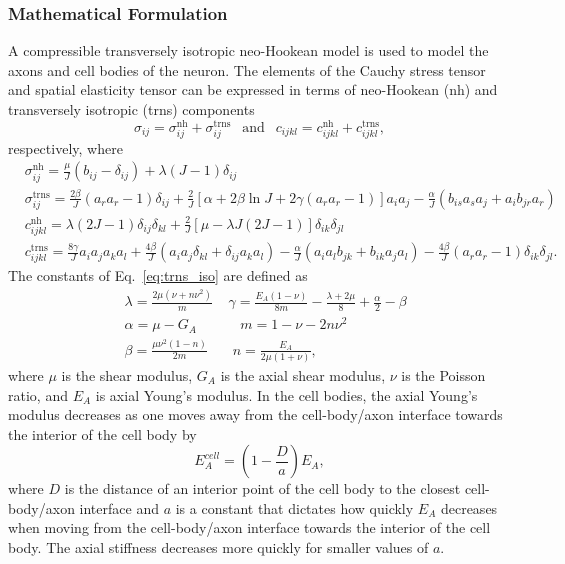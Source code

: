 \documentclass[10pt]{asme2ej}
\begin{document}
\subsubsection{Mathematical Formulation}
A compressible transversely isotropic neo-Hookean model is used to model \cite{Bonet:1998vc} the axons and cell bodies of the neuron. The elements of the Cauchy stress tensor and spatial elasticity tensor can be expressed in terms of neo-Hookean (nh) and transversely isotropic (trns) components \cite{Bonet:1998vc}
%
\begin{equation}
\sigma_{ij} = \sigma^{\text{nh}}_{ij} + \sigma^{\text{trns}}_{ij} \ \ \text{ and } \ \ c_{ijkl} = c^{\text{nh}}_{ijkl} + c^{\text{trns}}_{ijkl},
\end{equation}
%
respectively, where 
%
\begin{align}
&\sigma^{\text{nh}}_{ij} = \frac{\mu}{J}(b_{ij} - \delta_{ij}) + \lambda(J-1)\delta_{ij} \nonumber\\
%
&\sigma^{\text{trns}}_{ij} = \frac{2\beta}{J}(a_r a_r - 1)\delta_{ij} + \frac{2}{J}[\alpha+2\beta\ln J+2\gamma(a_r a_r -1)]a_i a_j - \frac{\alpha}{J}(b_{is}a_s a_j+a_i b_{jr}a_r) \nonumber\\
%
&c^{\text{nh}}_{ijkl} = \lambda(2J-1)\delta_{ij}\delta_{kl} + \frac{2}{J}[\mu - \lambda J(2J-1)]\delta_{ik}\delta_{jl} \nonumber\\
%
&c^{\text{trns}}_{ijkl} = \frac{8\gamma}{J}a_i a_j a_k a_l + \frac{4\beta}{J}(a_i a_j \delta_{kl} + \delta_{ij}a_k a_l) - \frac{\alpha}{J}(a_i a_l b_{jk} + b_{ik}a_j a_l) - \frac{4\beta}{J}(a_r a_r - 1)\delta_{ik}\delta_{jl}.
\label{eq:trns_iso}
\end{align}
%
The constants of Eq.\ \eqref{eq:trns_iso} are defined as
%
\begin{align}
&\lambda = \frac{2\mu (\nu+n\nu^2)}{m} \ \ \ \ \ \gamma = \frac{E_A(1-\nu)}{8m} - \frac{\lambda+2\mu}{8} + \frac{\alpha}{2} - \beta \nonumber\\
%
&\alpha = \mu - G_A \ \ \ \ \ \ \ \ \ \ \ \ \ \ m = 1 - \nu - 2 n\nu^2 \nonumber\\
%
&\beta = \frac{\mu \nu^2(1-n)}{2m} \ \ \ \ \ \ \ \ n = \frac{E_A}{2\mu(1+\nu)},
\label{eq:trns_iso_constants}
\end{align}
%
where $\mu$ is the shear modulus, $G_A$ is the axial shear modulus, $\nu$ is the Poisson ratio, and $E_A$ is axial Young's modulus. In the cell bodies, the axial Young's modulus decreases as one moves away from the cell-body/axon interface towards the interior of the cell body by 
%
\begin{equation}
E_A^{cell} = \left(1 - \frac{D}{a}\right)E_A,
\label{eq:cellEA}
\end{equation}
%
where $D$ is the distance of an interior point of the cell body to the closest cell-body/axon interface and $a$ is a constant that dictates how quickly $E_A$ decreases when moving from the cell-body/axon interface towards the interior of the cell body. The axial stiffness decreases more quickly for smaller values of $a$.
\end{document}
